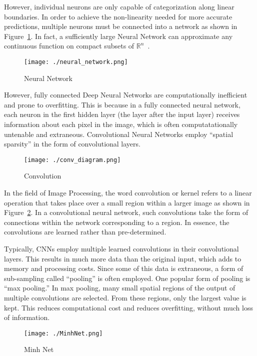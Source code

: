 \documentclass{article}
\begin{document}
However, individual neurons are only capable of categorization along linear
boundaries. In order to achieve the non-linearity needed for more accurate
predictions, multiple neurons must be connected into a network as shown in
Figure~\ref{fig:neuralNetwork}. In fact, a sufficiently large Neural Network can
approximate any continuous function on compact subsets of
$\mathbb{R}^n$~\cite{hornik_1991}.

\begin{figure}[h]
\centering
\caption{Neural Network}
\texttt{[image: ./neural\_network.png]}
\label{fig:neuralNetwork}
\end{figure}

However, fully connected Deep Neural Networks are computationally inefficient
and prone to overfitting. This is because in a fully connected neural network,
each neuron in the first hidden layer (the layer after the input layer) receives
information about each pixel in the image, which is often computatationally
untenable and extraneous. Convolutional Neural Networks employ ``spatial
sparsity'' in the form of convolutional layers. 

\begin{figure}[h]
\centering
\caption{Convolution}
\texttt{[image: ./conv\_diagram.png]}
\label{fig:kernel}
\end{figure}

In the field of Image Processing, the word convolution or kernel refers to a linear
operation that takes place over a small region within a larger image as shown in
Figure~\ref{fig:kernel}. In a convolutional neural network, such convolutions
take the form of connections within the network corresponding to a region. In
essence, the convolutions are learned rather than pre-determined. 

Typically, CNNs employ multiple learned convolutions in their convolutional
layers. This results in much more data than the original input, which adds to
memory and processing costs. Since some of this data is extraneous, a form of
sub-sampling called ``pooling'' is often employed. One popular form of pooling is
``max pooling.'' In max pooling, many small spatial regions of the output of
multiple convolutions are selected. From these regions, only the largest value
is kept. This reduces computational cost and reduces overfitting, without much
loss of information.

\begin{figure}[h!]
\centering
\caption{Minh Net}
\texttt{[image: ./MinhNet.png]}
\label{fig:minh}
\end{figure}
\end{document}
